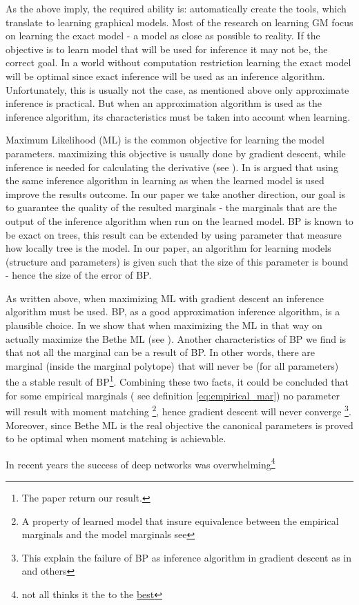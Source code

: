 As the above imply, the required ability is: automatically create the tools, which translate to learning graphical models.
Most of the research on learning GM focus on learning the exact model - a model as close as possible to reality.
If the objective is to learn model that will be used for inference it may not be, the correct goal.
In a world without computation restriction learning the exact model will be optimal since exact inference will be used as an inference algorithm.
Unfortunately, this is usually not the case, as mentioned above only approximate inference is practical.
But when an approximation algorithm is used as the inference algorithm, its characteristics must be taken into account when learning.

Maximum Likelihood (ML) is the common objective for learning the model parameters.
maximizing this objective is usually done by gradient descent, while inference is needed for calculating the derivative (see ).
In \cite{wainwright2006estimating} is argued that using the same inference algorithm in learning as when the learned model is used improve the results outcome.
In our paper \cite{heinemann2014inferning} we take another direction, our goal is to guarantee the quality of the resulted marginals - the marginals that are the output of the inference algorithm when run on the learned model.
BP is known to be exact on trees, this result can be extended by using parameter that measure how locally tree is the model.
In our paper, an algorithm for learning models (structure and parameters) is given such that the size of this parameter is bound - hence the size of the error of BP.

As written above, when maximizing ML with gradient descent an inference algorithm must be used.
BP, as a good approximation inference algorithm, is a plausible choice.
In \cite{heinemann2012cannot} we show that when maximizing the ML in that way on actually maximize the Bethe ML (see ).
Another characteristics of BP we find is that not all the marginal can be a result of BP.
In other words, there are marginal (inside the marginal polytope) that will never be (for all parameters) the a stable result of BP\footnote{ The paper \cite{pitkow2011learning} return our result.}.
Combining these two facts, it could be concluded that for some empirical marginals ( see definition \eqref{eq:empirical_mar}) no parameter will result with moment matching \footnote{ A property of learned model that insure equivalence between the empirical marginals and the model marginals see }, hence gradient descent will never converge \footnote{This explain the failure of BP as inference algorithm in gradient descent as in \cite{wainwright2006estimating} and others}.
Moreover, since Bethe ML is the real objective the canonical parameters is proved to be optimal when moment matching is achievable.

In recent years the success of deep networks was overwhelming\footnote{not all thinks it the to the \href{https://www.linkedin.com/pulse/computer-vision-research-my-deep-depression-nikos-paragios?trk=hp-feed-article-title-like}{best}}


  

